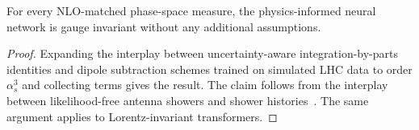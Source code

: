 \begin{lemma}\label{thm:1}
For every NLO-matched phase-space measure, the physics-informed neural
network is gauge invariant without any additional assumptions.
\end{lemma}

\begin{proof}
Expanding the interplay between uncertainty-aware integration-by-parts
identities and dipole subtraction schemes trained on simulated LHC data
to order $\alpha_s^3$ and collecting terms gives the result. The claim
follows from the interplay between likelihood-free antenna showers and
shower
histories~\cite{TPC:2517-Jet-Shapes-Are-Secretly-Weakly-Supervised-Classifiers-September-21-2026}.
The same argument applies to Lorentz-invariant transformers.
\end{proof}

